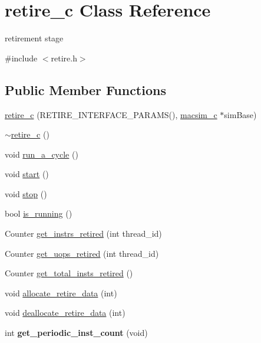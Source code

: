 \hypertarget{classretire__c}{
\section{retire\_\-c Class Reference}
\label{classretire__c}
}


retirement stage  




{\ttfamily \#include $<$retire.h$>$}

\subsection*{Public Member Functions}
\begin{DoxyCompactItemize}
\item 
\hyperlink{classretire__c_a5310845cf7bee50f1bbc9c2b1e731e80}{retire\_\-c} (RETIRE\_\-INTERFACE\_\-PARAMS(), \hyperlink{classmacsim__c}{macsim\_\-c} $\ast$simBase)
\item 
\hyperlink{classretire__c_a9d262d8ca4b2e9de0729d73c2c293ee7}{$\sim$retire\_\-c} ()
\item 
void \hyperlink{classretire__c_a438f9012b09989659d8ef4327f2bb77a}{run\_\-a\_\-cycle} ()
\item 
void \hyperlink{classretire__c_a818ade739285989194fda54e649cdaa3}{start} ()
\item 
void \hyperlink{classretire__c_a9e773dd9d20ce1b75f0fd169cc6ea281}{stop} ()
\item 
bool \hyperlink{classretire__c_a654a996cb34a4e5c0d37067a6790acc9}{is\_\-running} ()
\item 
Counter \hyperlink{classretire__c_a0fefc3d4fb52bd905f71e658706775a5}{get\_\-instrs\_\-retired} (int thread\_\-id)
\item 
Counter \hyperlink{classretire__c_a2e089e4af473a1d17cb7648d3e9baa10}{get\_\-uops\_\-retired} (int thread\_\-id)
\item 
Counter \hyperlink{classretire__c_ac8b2d59e8cd9a0810ba4c993254fce89}{get\_\-total\_\-insts\_\-retired} ()
\item 
void \hyperlink{classretire__c_a7625722bdf7f036d8e2fcb374801ddd2}{allocate\_\-retire\_\-data} (int)
\item 
void \hyperlink{classretire__c_afd9831ac670b912e9702abd2bb24d3c3}{deallocate\_\-retire\_\-data} (int)
\item 
\hypertarget{classretire__c_acffa17bdf1d58a503a9ecda79caa4acc}{
int {\bfseries get\_\-periodic\_\-inst\_\-count} (void)}
\label{classretire__c_acffa17bdf1d58a503a9ecda79caa4acc}

\end{DoxyCompactItemize}
